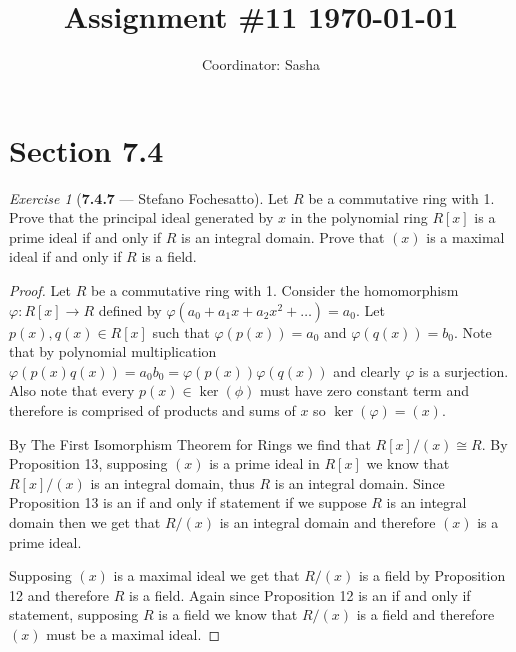 \documentclass[12pt]{amsart}
\title{Assignment \#11 \today}
\author{Coordinator: Sasha}
\theoremstyle{remark}
\newtheorem*{exercise}{Exercise}%
\theoremstyle{mycomment}
\begin{document}
\maketitle
\doublespacing %


\section*{Section 7.4}

\begin{exercise}[\textbf{7.4.7} --- Stefano Fochesatto] Let $R$ be a commutative ring with 1. Prove that the principal ideal generated by $x$
  in the polynomial ring $R[x]$ is a prime ideal if and only if $R$ is an integral domain. Prove that $(x)$ is a 
  maximal ideal if and only if $R$ is a field. 
  \begin{proof} Let $R$ be a commutative ring with 1. Consider the homomorphism $\varphi: R[x] \to R$ defined by 
    $\varphi(a_0 + a_1x + a_2x^2 + \dots) = a_0$. Let $p(x), q(x) \in R[x]$ such that $\varphi(p(x)) = a_0$ and $\varphi(q(x)) = b_0$.
    Note that by polynomial multiplication $\varphi(p(x)q(x)) = a_0b_0 = \varphi(p(x))\varphi(q(x))$ and clearly $\varphi$ is a surjection.
    Also note that every $p(x) \in \ker(\phi)$ must have zero constant term and therefore is comprised of products and sums of $x$ so $\ker(\varphi) = (x)$.

    By The First Isomorphism Theorem for Rings we find that $R[x]/(x) \cong R$. By Proposition 13, supposing $(x)$ is a prime ideal in $R[x]$ we know that $R[x]/(x)$ is an integral domain, thus $R$ is an integral domain. 
    Since Proposition 13 is an if and only if statement if we suppose $R$ is an integral domain then we get that $R/(x)$ is an integral domain and therefore $(x)$ is a prime ideal. 

    Supposing $(x)$ is a maximal ideal we get that $R/(x)$ is a field by Proposition 12 and therefore $R$ is a field. 
    Again since Proposition 12 is an if and only if statement, supposing $R$ is a field we know that $R/(x)$ is a field and therefore 
    $(x)$ must be a maximal ideal. 

  \end{proof}
\end{exercise}
\vspace{.5in}
\end{document}
